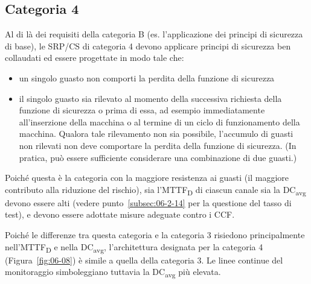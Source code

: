 \subsection{Categoria 4}
\label{subsec:06-2-7}
Al di là dei requisiti della categoria B (es. l'applicazione dei principi di sicurezza di base), le SRP/CS di categoria 4 devono applicare principi di sicurezza ben collaudati ed essere progettate in modo tale che:
\begin{itemize}
    \item un singolo guasto non comporti la perdita della funzione di sicurezza
    \item il singolo guasto sia rilevato al momento della successiva richiesta della funzione di sicurezza o prima di essa, ad esempio immediatamente all'inserzione della macchina o al termine di un ciclo di funzionamento della macchina. Qualora tale rilevamento non sia possibile, l'accumulo di guasti non rilevati non deve comportare la perdita della funzione di sicurezza. (In pratica, può essere sufficiente considerare una combinazione di due guasti.)
\end{itemize}

\begin{center}
    \begin{minipage}{\textwidth}
        \centering
        \captionsetup{hypcap=false}
        \resizebox{0.85\textwidth}{!}{}
        \label{fig:06-08}
    \end{minipage}
\end{center}

Poiché questa è la categoria con la maggiore resistenza ai guasti (il maggiore contributo alla riduzione del rischio), sia l'MTTF\textsubscript{D} di ciascun canale sia la DC\textsubscript{avg} devono essere alti (vedere punto~\ref{subsec:06-2-14} per la questione del tasso di test), e devono essere adottate misure adeguate contro i CCF.

Poiché le differenze tra questa categoria e la categoria 3 risiedono principalmente nell'MTTF\textsubscript{D} e nella DC\textsubscript{avg}, l'architettura designata per la categoria 4 (Figura~\ref{fig:06-08}) è simile a quella della categoria 3. Le linee continue del monitoraggio simboleggiano tuttavia la DC\textsubscript{avg} più elevata.

